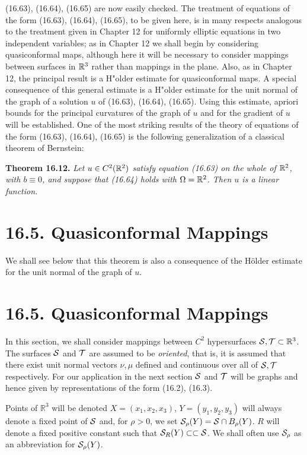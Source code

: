 (16.63), (16.64), (16.65) are now easily checked.
The treatment of equations of the form (16.63), (16.64), (16.65), to be given here,
is in many respects analogous to the treatment given in Chapter 12 for uniformly
elliptic equations in two independent variables; as in Chapter 12 we shall begin by
considering quasiconformal maps, although here it will be necessary to consider
mappings between surfaces in $\mathbb{R}^3$ rather than mappings in the plane. Also, as in
Chapter 12, the principal result is a H"older estimate for quasiconformal maps. A
special consequence of this general estimate is a H"older estimate for the unit normal
of the graph of a solution $u$ of (16.63), (16.64), (16.65). Using this estimate, apriori
bounds for the principal curvatures of the graph of $u$ and for the gradient of $u$ will
be established. One of the most striking results of the theory of equations of the
form (16.63), (16.64), (16.65) is the following generalization of a classical theorem
of Bernstein:

\textbf{Theorem 16.12.} \textit{Let $u\in C^2(\mathbb{R}^2)$ satisfy equation (16.63) on the whole of $\mathbb{R}^2$, with
$b\equiv 0$, and suppose that (16.64) holds with $\Omega=\mathbb{R}^2$. Then $u$ is a linear function.}



\section*{16.5. Quasiconformal Mappings}

We shall see below that this theorem is also a consequence of the H\"older estimate for the unit normal of the graph of $u$.

\section*{16.5. Quasiconformal Mappings}

In this section, we shall consider mappings between $C^2$ hypersurfaces $\mathcal{S},\mathcal{T}\subset\mathbb{R}^3$.
The surfaces $\mathcal{S}$ and $\mathcal{T}$ are assumed to be \emph{oriented}, that is, it is assumed that there
exist unit normal vectors $\nu,\mu$ defined and continuous over all of $\mathcal{S},\mathcal{T}$ respectively.
For our application in the next section $\mathcal{S}$ and $\mathcal{T}$ will be graphs and hence given by
representations of the form (16.2), (16.3).

Points of $\mathbb{R}^3$ will be denoted $X=(x_1,x_2,x_3)$, $Y=(y_1,y_2,y_3)$ will always denote a
fixed point of $\mathcal{S}$ and, for $\rho>0$, we set $\mathcal{S}_\rho(Y)=\mathcal{S}\cap B_\rho(Y)$. $R$ will denote a fixed
positive constant such that $\mathcal{S}_R(Y)\subset\subset\mathcal{S}$. We shall often use $\mathcal{S}_\rho$ as an abbreviation
for $\mathcal{S}_\rho(Y)$.

